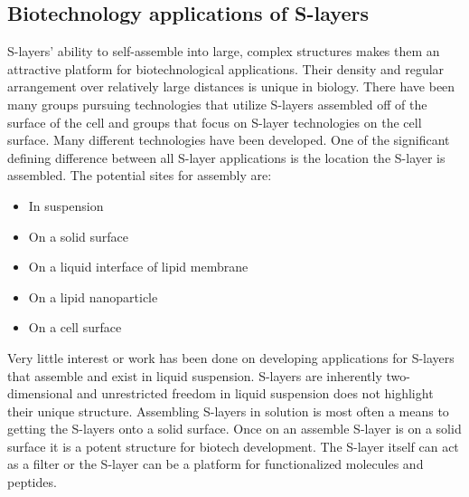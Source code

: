   \subsection{Biotechnology applications of S-layers}\label{sec:biot-appl-s} 
  
  \Acp{S-layer}' ability to self-assemble into large, complex structures makes them  an attractive platform for biotechnological applications. Their density and regular arrangement over relatively large distances is unique in biology. There have been many groups pursuing technologies that utilize \acp{S-layer} assembled off of the surface of the cell and groups that focus on \ac{S-layer} technologies on the cell surface. Many different technologies have been developed.
  One of the significant defining difference between all \ac{S-layer} applications is the location the \ac{S-layer} is assembled. The potential sites for assembly are:
  \begin{itemize}
  \item In suspension
  \item On a solid surface
  \item On a liquid interface of lipid membrane
  \item On a lipid nanoparticle
  \item On a cell surface
  \end{itemize}

  Very little interest or work has been done on developing applications for \acp{S-layer} that assemble and exist in liquid suspension. \Acp{S-layer} are inherently two-dimensional and unrestricted freedom in liquid suspension does not highlight their unique structure. Assembling \acp{S-layer} in solution is most often a means to getting the \acp{S-layer} onto a solid surface. Once on an assemble \ac{S-layer} is on a solid surface it is a potent structure for biotech development. The \ac{S-layer} itself can act as a filter or the \ac{S-layer} can be a platform for functionalized molecules and peptides.

